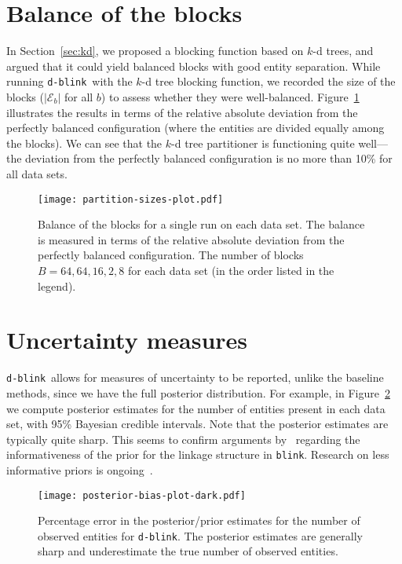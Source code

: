 \documentclass[12pt,letterpaper]{article}
\newcommand{\partset}{\mathcal{E}} %
\newcommand{\1}[1]{\mathbb{I}\!\left[#1\right]} %
\newcommand{\dblink}{\texttt{\upshape \lowercase{d-blink}}} %
\newcommand{\blink}{\texttt{\upshape \lowercase{blink}}} %
\begin{document}
\section{Balance of the blocks}
\label{app-sec:balance-partitions}
In Section~\ref{sec:kd}, we proposed a blocking function based on $k$-d 
trees, and argued that it could yield balanced blocks with good entity 
separation.
While running \dblink\ with the $k$-d tree blocking function, we recorded the 
size of the blocks ($|\partset_{b}|$ for all $b$) to assess whether 
they were well-balanced.
Figure~\ref{app-fig:partition-sizes} illustrates the results in terms of the 
relative absolute deviation from the perfectly balanced configuration
(where the entities are divided equally among the blocks). 
We can see that the $k$-d tree partitioner is functioning quite well---the 
deviation from the perfectly balanced configuration is no more than 10\% for 
all data sets.

\begin{figure}
  \centering
  \texttt{[image: partition-sizes-plot.pdf]}
  \caption{Balance of the blocks for a single run on each
    data set.
    The balance is measured in terms of the relative absolute 
    deviation from the perfectly balanced configuration.
    The number of blocks $B = 64, 64, 16, 2, 8$ for each data set (in the 
    order listed in the legend).
  }
  \label{app-fig:partition-sizes}
\end{figure}

\section{Uncertainty measures}
\label{app-sec:error-num-ents}
\dblink\ allows for measures of uncertainty to be reported, unlike the 
baseline methods, since we have the full posterior distribution.
For example, in Figure~\ref{app-fig:error-num-ents} we compute posterior estimates 
for the number of entities present in each data set, with 95\% 
Bayesian credible intervals.
Note that the posterior estimates are typically quite 
sharp.
This seems to confirm arguments by~\citet{steorts_bayesian_2016} 
regarding the informativeness of the prior for the linkage 
structure in \blink. 
Research on less informative priors is ongoing~\citep{zanella_flexible_2016}.

\begin{figure}
  \centering
  \texttt{[image: posterior-bias-plot-dark.pdf]}
  \caption{Percentage error in the posterior\slash prior estimates for the 
    number of observed entities for \dblink.
    The posterior estimates are generally sharp and underestimate the true 
    number of observed entities.
  }
  \label{app-fig:error-num-ents}
\end{figure}
\end{document}
